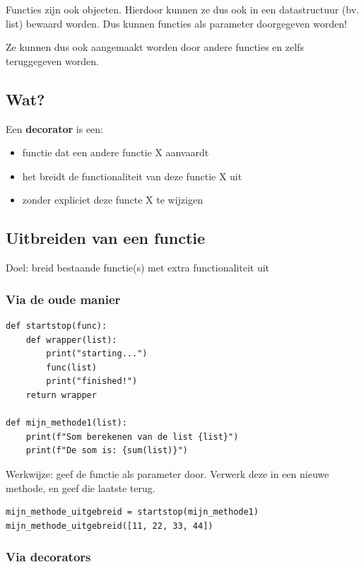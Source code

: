 \documentclass{article}
\begin{document}
Functies zijn ook objecten. Hierdoor kunnen ze dus ook in een datastructuur (bv. list) bewaard worden.
Dus kunnen functies als parameter doorgegeven worden!

Ze kunnen dus ook aangemaakt worden door andere functies en zelfs teruggegeven worden.

\subsection{Wat?}

Een \textbf{decorator} is een:

\begin{itemize}
    \item functie dat een andere functie X aanvaardt
    \item het breidt de functionaliteit van deze functie X uit
    \item zonder expliciet deze functe X te wijzigen
\end{itemize}

\subsection{Uitbreiden van een functie}

Doel: breid bestaande functie(s) met extra functionaliteit uit

\subsubsection{Via de oude manier}

\begin{verbatim}
def startstop(func):
    def wrapper(list):
        print("starting...")
        func(list)
        print("finished!")
    return wrapper

def mijn_methode1(list):
    print(f"Som berekenen van de list {list}")
    print(f"De som is: {sum(list)}")
\end{verbatim}

Werkwijze: geef de functie als parameter door. Verwerk deze in een nieuwe methode, en geef die laatste terug.

\begin{verbatim}
mijn_methode_uitgebreid = startstop(mijn_methode1)
mijn_methode_uitgebreid([11, 22, 33, 44])
\end{verbatim}

\subsubsection{Via decorators}
\end{document}

